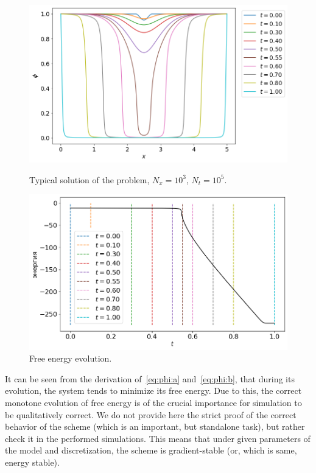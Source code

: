 \begin{figure}[!p]
  \centering
  \includegraphics[width=\textwidth]{figures/typical_solution.png}
  \vspace{-0.8cm}
  \caption{Typical solution of the problem, $N_x = 10^3$, $N_t = 10^5$.}
  \label{fig:typical_solution}
  
  \vspace{1.5cm}
  
  \includegraphics[width=\textwidth]{figures/energy_total.png}
  \caption{Free energy evolution.}
  \label{fig:energy}
\end{figure}

It can be seen from the derivation of~\eqref{eq:phi:a} and~\eqref{eq:phi:b},
that during its evolution, the system tends to minimize its free energy.
Due to this, the correct monotone evolution of free energy
is of the crucial importance for simulation to be qualitatively correct.
We do not provide here the strict proof of the correct behavior of the
scheme (which is an important, but standalone task), but rather check
it in the performed simulations. This means that under given
parameters of the model and discretization, the scheme is
gradient-stable (or, which is same, energy stable).



